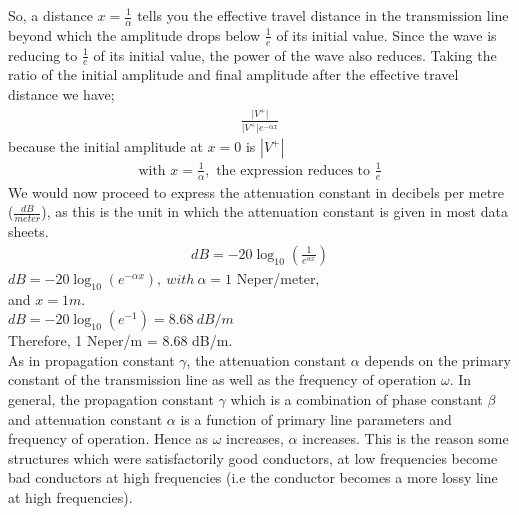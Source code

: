 So, a distance $x = \frac{1}{\alpha}$ tells you the effective travel distance in the transmission line beyond which the amplitude drops below $\frac{1}{e}$ of its initial value. Since the wave is reducing to $\frac{1}{e}$ of its initial value, the power of the wave also reduces. Taking the ratio of the initial amplitude and final amplitude after the effective travel distance we have;
\begin{align*}
\frac{\lvert V^+\rvert}{\lvert V^+\rvert e ^{-\alpha x}}
\end{align*}
because the initial amplitude at $x = 0$ is $\left| V^+\right|$
\begin{align*}
\text{with }x = \frac{1}{\alpha},\text{ the expression reduces to }\frac{1}{e}
\end{align*}
We would now proceed to express the attenuation constant in decibels per metre ($\frac{dB}{meter}$), as this is the unit in which the attenuation constant is given in most data sheets.
\begin{align*}
dB = -20\log_{10}(\frac{1}{e^{\alpha x}})
\end{align*}
$ dB = -20\log_{10}(e^{-\alpha x}), \ with \ \alpha = 1 $ Neper/meter,\\ and $ x = 1m $. \\
$ dB = -20\log_{10}(e^{-1}) = 8.68\ dB/m  $\\
Therefore, 1 Neper/m = 8.68 dB/m.\\

As in propagation constant $\gamma$, the attenuation constant $\alpha$ depends on the primary constant of the transmission line as well as the frequency of operation $\omega$. In general, the propagation constant $\gamma$ which is a combination of phase constant $\beta$ and attenuation constant $\alpha$ is a function of primary line parameters and frequency of operation. Hence as $\omega$ increases, $\alpha$ increases. This is the reason some structures which were satisfactorily good conductors, at low frequencies become bad conductors at high frequencies (i.e the conductor becomes a more lossy line at high frequencies).

